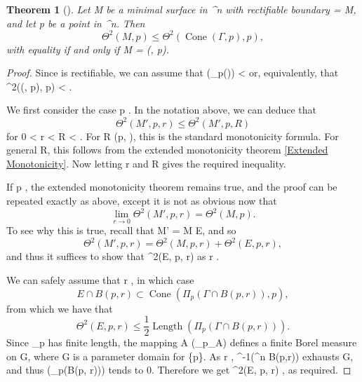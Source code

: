 \documentclass[a4paper, 11pt]{article}
\theoremstyle{plain}
\newtheorem{theorem}{Theorem}[section]
\theoremstyle{definition}
\theoremstyle{remark}
\numberwithin{equation}{subsection}
\def\({}
\def\){}
\def\pi{}
\begin{document}
\begin{theorem}[{\cite[Theorem 1.3]{EWW02}}]
\label{Interior_regularity_basic_estimate}
Let \(M\) be a minimal surface in \(^{n}\) with rectifiable boundary \(\Gamma = \partial M\), and let \(p\) be a point in \(^{n}\). Then
\begin{equation}
\Theta^{2}(M,p) \leqslant \Theta^{2}(\operatorname{Cone}(\Gamma, p), p),
\end{equation}
with equality if and only if \(M = (\Gamma, p)\).
\end{theorem}

\begin{proof}
Since \(\Gamma\) is rectifiable, we can assume that \((\Pi_{p}(\Gamma)) < \infty\) or, equivalently, that \(\Theta^{2}((\Gamma, p), p) < \infty\). 

We first consider the case \(p \notin \Gamma\). In the notation above, we can deduce that
\begin{equation}
\Theta^{2}(M', p, r) \leqslant \Theta^{2}(M', p, R)
\end{equation}
for \(0 < r < R < \infty\). For \(R \leqslant {}(p, \Gamma)\), this is the standard monotonicity formula. For general \(R\), this follows from the extended monotonicity theorem \ref{Extended Monotonicity}. Now letting \(r \) and \(R \rightarrow \infty\) gives the required inequality.

If \(p \in \Gamma\), the extended monotonicity theorem remains true, and the proof can be repeated exactly as above, except it is not as obvious now that
\begin{equation}
\lim_{r \rightarrow 0} \Theta^{2}(M', p, r) = \Theta^{2}(M, p).
\end{equation}
To see why this is true, recall that \(M' = M \cup E\), and so
\begin{equation}
\Theta^{2}(M', p, r) = \Theta^{2}(M, p, r) + \Theta^{2}(E, p, r),
\end{equation}
and thus it suffices to show that \(\Theta^{2}(E, p, r) \) as \(r \).

We can safely assume that \(r \), in which case
\begin{equation}
E \cap B(p, r) \subset \operatorname{Cone}(\Pi_{p}(\Gamma \cap B(p, r)), p),
\end{equation}
from which we have that
\begin{equation}
\Theta^{2}(E, p, r) \leqslant \frac{1}{2\pi}\operatorname{Length}(\Pi_{p}(\Gamma \cap B(p, r))).
\end{equation}
Since \(\Pi_{p}\Gamma\) has finite length, the mapping \(A \mapsto {}(\Pi_{p}\Gamma \vert_{A})\) defines a finite Borel measure on \(G\), where \(G\) is a parameter domain for \(\Gamma \setminus \{p\}\). As \(r \), \(\Gamma^{-1}(^{n} \setminus B(p,r))\) exhausts \(G\), and thus \((\Pi_{p}(\Gamma \cap B(p, r)))\) tends to \(0\). Therefore we get \(\Theta^{2}(E, p, r) \), as required.
\end{proof}
\end{document}
